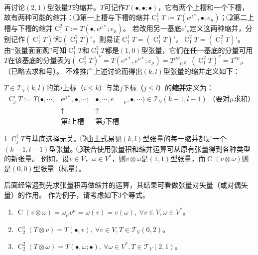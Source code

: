 再讨论$(2, 1)$型张量$T$的缩并。$T$可记作$T(\bullet, \bullet; \bullet)$，它有两个上槽和一个下槽，故有两种可能的缩并：
\textcircled{1}第一上槽与下槽的缩并$\operatorname{C}^1_1T := T(e^{\mu*}, \bullet; e_\mu)$；
\textcircled{2}第二上槽与下槽的缩并$\operatorname{C}^2_1T := T(\bullet, e^{\mu*}; e_\mu)$。
若改用另一基底${e'_\rho}$定义这两种缩并，分别记作$(\operatorname{C}^1_1T)'$和$(\operatorname{C}^2_1T)'$，则易证$\operatorname{C}^1_1T = (\operatorname{C}^1_1T)'$，$\operatorname{C}^2_1T = (\operatorname{C}^2_1T)'$。
由``张量面面观''可知$\operatorname{C}^1_1T$和$\operatorname{C}^2_1T$都是$(1, 0)$型张量，它们在任一基底的分量可用$T$在该基底的分量表为$(\operatorname{C}^1_1T)^\nu = T(e^{\mu*}, e^{\nu*}; e_\mu) = T^{\mu\nu}{}_\mu$，$(\operatorname{C}^2_1T)^\nu = T^{\nu\mu}{}_\mu$（已略去求和号）。
不难推广上述讨论而得出$(k, l)$型张量的缩并定义如下：

\begin{definition}
$T \in \mathscr{T}_V(k, l)$的第$i$上标（$i \leq k$）与第$j$下标（$j \leq l$）的\textbf{缩并}定义为：
$$\begin{aligned}
\operatorname{C}^i_jT := T(\bullet, \cdots, & e^{\mu*}, \bullet, \cdots; & \bullet, \cdots, e&_\mu, \bullet, \cdots) \in \mathscr{T}_V(k - 1, l - 1) ~ \text{（要对$\mu$求和）} \\
& \uparrow & \uparrow & \\
& \text{第$i$上槽} & \text{第$j$下槽} &
\end{aligned}$$
\end{definition}

\begin{note}
\textcircled{1}$\operatorname{C}^i_jT$与基底选择无关。
\textcircled{2}由上式易见$(k, l)$型张量的每一缩并都是一个$(k - 1, l - 1)$型张量。
\textcircled{3}联合使用张量积和缩并运算可从原有张量得到各种类型的新张量。
例如，设$v \in V$，$\omega \in V^*$，则$v \otimes \omega$是$(1, 1)$型张量，而$\operatorname{C}(v \otimes \omega)$则是$(0, 0)$型张量（标量）。
\end{note}

后面经常遇到先求张量积再做缩并的运算，其结果可看做张量对矢量（或对偶矢量）的作用。
作为例子，请考虑如下$3$个等式。

\begin{enumerate}[（a）]
\item $\operatorname{C}(v \otimes \omega) = \omega_\mu v^\mu = \omega(v) = v(\omega), ~ \forall v \in V, \omega \in V^*$。
\item $\operatorname{C}^1_2(T \otimes v) = T(\bullet, v), ~ \forall v \in V, T \in \mathscr{T}_V(0, 2)$。
\item $\operatorname{C}^2_2(T \otimes \omega) = T(\bullet, \omega; \bullet), ~ \forall \omega \in V^*, T \in \mathscr{T}_V(2, 1)$。
\end{enumerate}

